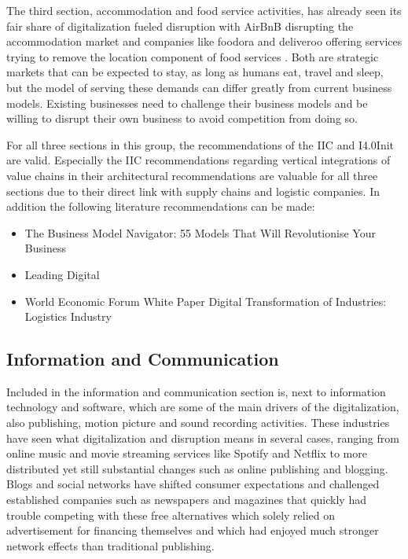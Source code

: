 The third section, accommodation and food service activities, has already seen its fair share of digitalization fueled disruption with AirBnB disrupting the accommodation market and companies like foodora and deliveroo offering services trying to remove the location component of food services \cite{bloombergfoodora:2016}. Both are strategic markets that can be expected to stay, as long as humans eat, travel and sleep, but the model of serving these demands can differ greatly from current business models. Existing businesses need to challenge their business models and be willing to disrupt their own business to avoid competition from doing so.

For all three sections in this group, the recommendations of the \ac{IIC} and \ac{I4.0Init} are valid. Especially the \ac{IIC} recommendations regarding vertical integrations of value chains in their architectural recommendations \cite{iicarchitecture:2016} are valuable for all three sections due to their direct link with supply chains and logistic companies. In addition the following literature recommendations can be made:

\begin{itemize}
    \item The Business Model Navigator: 55 Models That Will Revolutionise Your Business \cite{gassmann:gallen:2013geschaeftsmodelle}
    \item Leading Digital \cite{bonnect2014leading}
    \item World Economic Forum White Paper Digital Transformation of Industries: Logistics Industry \cite{worldforumlogistics:2016}
\end{itemize}

\subsection{Information and Communication}
Included in the information and communication section is, next to information technology and software, which are some of the main drivers of the digitalization, also publishing, motion picture and sound recording activities. These industries have seen what digitalization and disruption means in several cases, ranging from online music and movie streaming services like Spotify and Netflix to more distributed yet still substantial changes such as online publishing and blogging. Blogs and social networks have shifted consumer expectations and challenged established companies such as newspapers and magazines that quickly had trouble competing with these free alternatives which solely relied on advertisement for financing themselves and which had enjoyed much stronger network effects than traditional publishing. 

